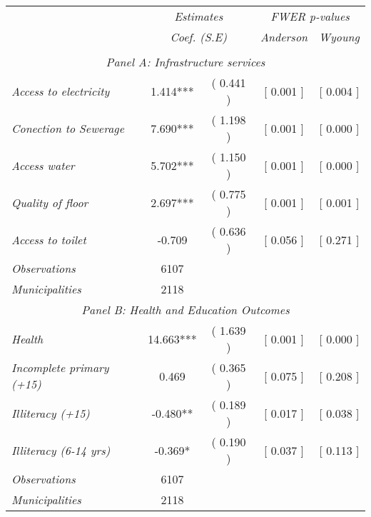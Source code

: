 

\begin{tabular}{lcccc}

\hline
\hline

\multicolumn{1}{l}{} & \multicolumn{2}{c}{\textit{Estimates}} & \multicolumn{2}{c}{\textit{FWER p-values}} \\
\multicolumn{1}{l}{} & \multicolumn{2}{c}{\textit{Coef. (S.E)}} & \multicolumn{1}{c}{\textit{Anderson}} & \multicolumn{1}{c}{\textit{Wyoung}} \\ 
 
\cmidrule(l{1mm}r{1mm}){2-3} \cmidrule(l{1mm}r{1mm}){4-5}  \\

\hline

\multicolumn{5}{c}{\textit{Panel  A: Infrastructure services}}   \\  

\textit{Access to electricity}  &  1.414***  & ( 0.441 ) & [ 0.001 ]  & [ 0.004 ] \\
\textit{Conection to Sewerage}  &  7.690***  & ( 1.198 ) & [ 0.001 ]  & [ 0.000 ] \\
\textit{Access water}  &  5.702***  & ( 1.150 ) & [ 0.001 ]  & [ 0.000 ] \\
\textit{Quality of floor}  &  2.697***  & ( 0.775 ) & [ 0.001 ]  & [ 0.001 ] \\
\textit{Access to toilet}  &  -0.709  & ( 0.636 ) & [ 0.056 ]  & [ 0.271 ] \\

\hline		

\textit{Observations} 	  &  6107 	 \\
\textit{Municipalities}   &  2118     \\

\hline		

\multicolumn{5}{c}{\textit{Panel  B: Health and Education Outcomes}}   \\  

\textit{Health}  &  14.663***  & ( 1.639 ) &  [ 0.001 ]  & [ 0.000 ] \\
\textit{Incomplete primary (+15)}  &  0.469  & ( 0.365 ) &  [ 0.075 ]  & [ 0.208 ] \\
\textit{Illiteracy (+15)}  &  -0.480**  & ( 0.189 ) &  [ 0.017 ]  & [ 0.038 ] \\
\textit{Illiteracy (6-14 yrs)}  &  -0.369*  & ( 0.190 ) &  [ 0.037 ]  & [ 0.113 ] \\

\hline		

\textit{Observations} 	  &   6107	\\
\textit{Municipalities}   &   2118   \\
\hline		
\hline	

\end{tabular}%

